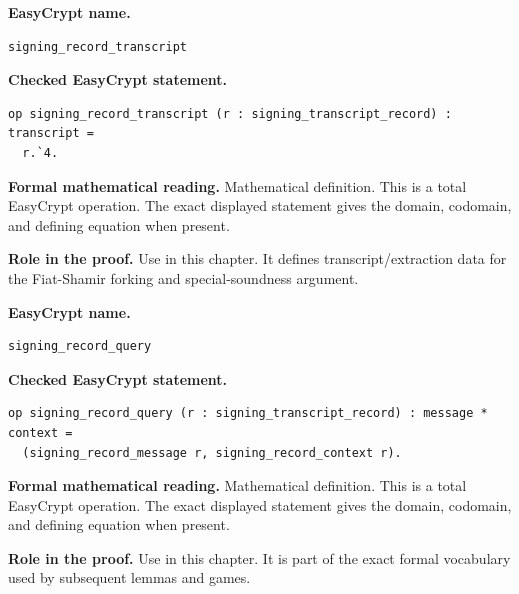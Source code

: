 \begin{formaldefinition}
\noindent\textbf{EasyCrypt name.}
\begin{lstlisting}[language=EasyCrypt,basicstyle=\ttfamily\scriptsize]
signing_record_transcript
\end{lstlisting}
\noindent\textbf{Checked EasyCrypt statement.}
\begin{lstlisting}[language=EasyCrypt,basicstyle=\ttfamily\scriptsize]
op signing_record_transcript (r : signing_transcript_record) : transcript =
  r.`4.
\end{lstlisting}
\noindent\textbf{Formal mathematical reading.}
Mathematical definition. This is a total EasyCrypt operation.  The exact displayed statement gives the domain, codomain, and defining equation when present.

\noindent\textbf{Role in the proof.}
Use in this chapter. It defines transcript/extraction data for the Fiat-Shamir forking and special-soundness argument.

\end{formaldefinition}

\begin{formaldefinition}
\noindent\textbf{EasyCrypt name.}
\begin{lstlisting}[language=EasyCrypt,basicstyle=\ttfamily\scriptsize]
signing_record_query
\end{lstlisting}
\noindent\textbf{Checked EasyCrypt statement.}
\begin{lstlisting}[language=EasyCrypt,basicstyle=\ttfamily\scriptsize]
op signing_record_query (r : signing_transcript_record) : message * context =
  (signing_record_message r, signing_record_context r).
\end{lstlisting}
\noindent\textbf{Formal mathematical reading.}
Mathematical definition. This is a total EasyCrypt operation.  The exact displayed statement gives the domain, codomain, and defining equation when present.

\noindent\textbf{Role in the proof.}
Use in this chapter. It is part of the exact formal vocabulary used by subsequent lemmas and games.

\end{formaldefinition}

